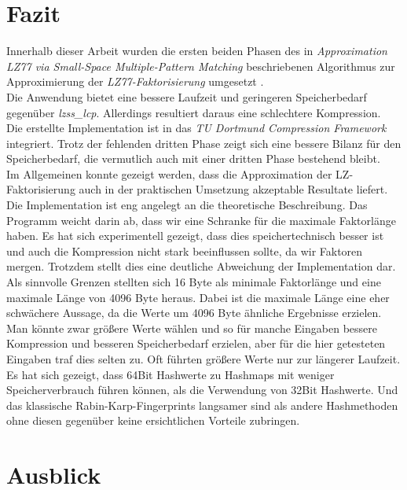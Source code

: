 \chapter{Fazit}	
Innerhalb dieser Arbeit wurden die ersten beiden Phasen des in  {\it Approximation LZ77 via Small-Space Multiple-Pattern Matching}  beschriebenen Algorithmus zur Approximierung der \textit{LZ77-Faktorisierung} umgesetzt \cite{LZ77Approx}.\\
Die Anwendung bietet eine bessere Laufzeit und geringeren Speicherbedarf gegenüber \emph{lzss\_lcp}. Allerdings resultiert daraus eine schlechtere Kompression.\\	
Die erstellte Implementation ist in das \emph{TU Dortmund Compression Framework} integriert. Trotz der  fehlenden dritten Phase zeigt sich eine bessere Bilanz für den Speicherbedarf, die vermutlich auch mit einer dritten Phase bestehend bleibt.\\	
Im Allgemeinen konnte gezeigt werden, dass die Approximation der LZ-Faktorisierung auch in der praktischen Umsetzung akzeptable Resultate liefert.\\
Die Implementation ist eng angelegt an die theoretische Beschreibung.
Das Programm weicht darin ab, dass wir eine Schranke für die maximale Faktorlänge haben.
Es hat sich experimentell gezeigt, dass dies speichertechnisch besser ist und auch die Kompression nicht stark beeinflussen sollte, da wir Faktoren mergen. Trotzdem stellt dies eine deutliche Abweichung der Implementation dar.\\
Als sinnvolle Grenzen stellten sich 16 Byte als minimale Faktorlänge und eine maximale Länge von 4096 Byte heraus. Dabei ist die maximale Länge eine eher schwächere Aussage, da die Werte um 4096  Byte ähnliche Ergebnisse erzielen. Man könnte zwar größere Werte wählen und so für manche Eingaben bessere Kompression und besseren Speicherbedarf erzielen, aber für die hier getesteten Eingaben traf dies selten zu. Oft führten größere Werte nur zur längerer Laufzeit.\\
Es hat sich gezeigt, dass 64Bit Hashwerte zu Hashmaps mit weniger Speicherverbrauch führen können, als die Verwendung von 32Bit Hashwerte. Und das klassische Rabin-Karp-Fingerprints langsamer sind als andere Hashmethoden ohne diesen gegenüber keine ersichtlichen Vorteile zubringen.

	
\chapter{Ausblick}

